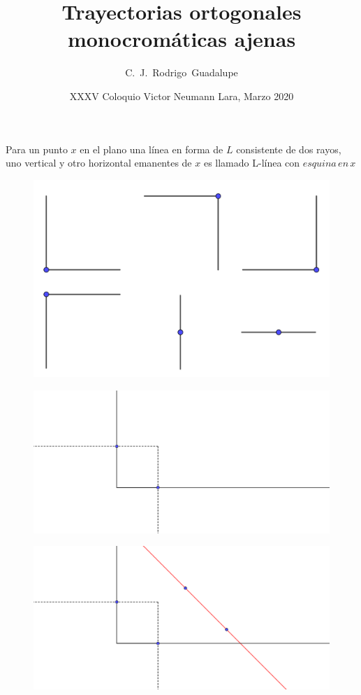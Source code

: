 \documentclass{beamer}
\title[Trayectorias ortogonales monocromáticas ajenas] %
{Trayectorias ortogonales monocromáticas ajenas}
\subtitle{}
\author[Rodrigo Chávez] %
{C.~J.~Rodrigo~Guadalupe\inst{1}}
\institute[VFU] %
{
  \inst{1}%
  Instituto de Matemáticas\\
  Universidad Nacional Autónoma de México

}
\date[VNL 2020] %
{XXXV Coloquio Victor Neumann Lara, Marzo 2020}
\begin{document}
\frame{\titlepage}


\begin{frame}
Para un punto $x$ en el plano una línea en forma de $L$ consistente de dos rayos, uno vertical y otro horizontal emanentes de $x$ es llamado L-línea con $esquina \, en \, x$
\end{frame}
\begin{frame}
\begin{figure}[h]
\includegraphics[width=\textwidth]{L-lineas}
\end{figure}
\end{frame}
\begin{frame}
\begin{figure}[h]
\includegraphics[width=\textwidth]{Diferencia-de-lineas-y-L-lineas}
\end{figure}
\end{frame}
\begin{frame}
\begin{figure}[h]
\includegraphics[width=\textwidth]{Diferencia-de-lineas-y-L-lineas-2}
\end{figure}
\end{frame}
\end{document}
